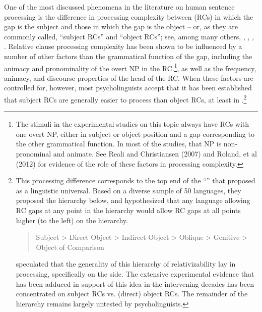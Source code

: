 \documentclass[a4paper]{article}
\begin{document}
One of the most discussed phenomena in the literature on human sentence processing is the difference in processing complexity between  (RCs) in which the gap is the subject and those in which the gap is the object -- or, as they are commonly called, ``subject RCs'' and ``object RCs''; see, among many others, \citet{WannerMaratsos78}, \citet{Gibson98a}, \citet{TraxlerEtal2002}, \citet{GennariMacDonald2008}.  Relative clause processing complexity has been shown to be influenced by a number of other factors than the grammatical function of the gap, including the animacy and pronominality of the overt NP in the RC.\footnote{The stimuli in the experimental studies on this topic always have RCs with one overt NP, either in subject or object position and a gap corresponding to the other grammatical function. In most of the studies, that NP is non-pronominal and animate.  See Reali and Christiansen (2007) and Roland, et al (2012) for evidence of the role of these factors in processing complexity.}, as well as the frequency, animacy, and discourse properties of the head of the RC.  When these factors are controlled for, however, most psycholinguists accept that it has been established that subject RCs are generally easier to process than object RCs, at least in .\footnote{This processing difference corresponds to the top end of the ``'' that \citet{KC77a} proposed as a linguistic universal. Based on a diverse sample of 50 languages, they proposed the hierarchy below, and hypothesized that any language allowing RC gaps at any point in the hierarchy would allow RC gaps at all points higher (to the left) on the hierarchy.
\begin{quote}

Subject 
> 
Direct Object 
> 
Indirect Object 
> 
Oblique 
> 
Genitive
> 
Object of Comparison
\end{quote}
\citeauthor{KC77a} speculated that the generality of this hierarchy of relativizability lay in processing, specifically on the  side.  The extensive experimental evidence that has been adduced in support of this idea in the intervening decades has been concentrated on subject RCs vs. (direct) object RCs.  The remainder of the hierarchy remains largely untested by psycholinguists.}
\end{document}

